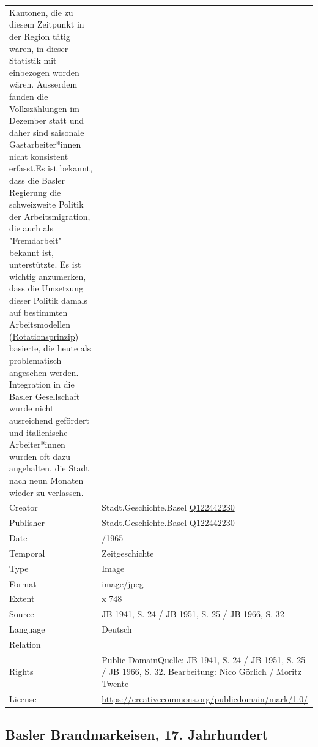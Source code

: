 \documentclass[
  letterpaper,
  DIV=11,
  numbers=noendperiod]{scrartcl}
\begin{document}
\begin{longtable}[]{@{}
  >{\raggedright\arraybackslash}p{}
  >{\raggedright\arraybackslash}p{}@{}}
Kantonen, die zu diesem Zeitpunkt in der Region tätig waren, in dieser
Statistik mit einbezogen worden wären. Ausserdem fanden die
Volkszählungen im Dezember statt und daher sind saisonale
Gastarbeiter*innen nicht konsistent erfasst.Es ist bekannt, dass die
Basler Regierung die schweizweite Politik der Arbeitsmigration, die auch
als "Fremdarbeit" bekannt ist, unterstützte. Es ist wichtig anzumerken,
dass die Umsetzung dieser Politik damals auf bestimmten Arbeitsmodellen
(\href{https://hls-dhs-dss.ch/de/articles/007991/2006-12-07/}{Rotationsprinzip})
basierte, die heute als problematisch angesehen werden. Integration in
die Basler Gesellschaft wurde nicht ausreichend gefördert und
italienische Arbeiter*innen wurden oft dazu angehalten, die Stadt nach
neun Monaten wieder zu verlassen. \\
Creator & Stadt.Geschichte.Basel
\href{https://www.wikidata.org/wiki/Q122442230}{Q122442230} \\
Publisher & Stadt.Geschichte.Basel
\href{https://www.wikidata.org/wiki/Q122442230}{Q122442230} \\
Date & 1920/1965 \\
Temporal & Zeitgeschichte \\
Type & Image \\
Format & image/jpeg \\
Extent & 1686 x 748 \\
Source & JB 1941, S. 24 / JB 1951, S. 25 / JB 1966, S. 32 \\
Language & Deutsch \\
Relation & \\
Rights & Public DomainQuelle: JB 1941, S. 24 / JB 1951, S. 25 / JB 1966,
S. 32. Bearbeitung: Nico Görlich / Moritz Twente \\
License & \url{https://creativecommons.org/publicdomain/mark/1.0/} \\
\end{longtable}

\subsection{Basler Brandmarkeisen, 17.
Jahrhundert}\label{basler-brandmarkeisen-17.-jahrhundert}
\end{document}
